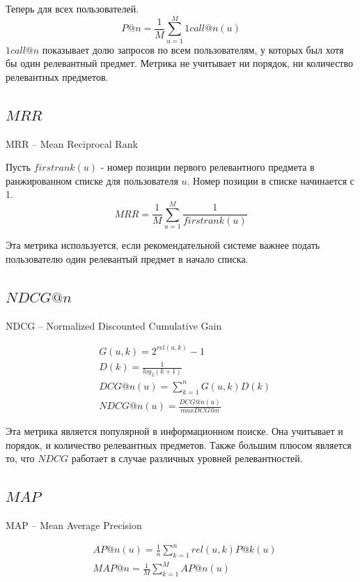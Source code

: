\documentclass[a4paper,12pt]{article}
\begin{document}
	Теперь для всех пользователей.
	\begin{equation*}
		P@n = \frac{1}{M}\sum_{u = 1}^M 1call@n(u)
	\end{equation*}
	$1call@n$ показывает долю запросов по всем пользователям, у которых был хотя бы один релевантный предмет. Метрика не учитывает  ни порядок, ни количество релевантных предметов. 
\subsection{$MRR$}
	MRR -- Mean Reciprocal Rank
	
	Пусть $firstrank(u)$  - номер позиции первого релевантного предмета в ранжированном списке для пользователя $u$. Номер позиции в списке начинается с 1.
	\begin{equation*}
		MRR = \frac{1}{M}\sum^{M}_{u=1}\frac{1}{firstrank(u)}	
	\end{equation*}
	
	Эта метрика используется, если рекомендательной системе важнее подать пользователю один релевантый предмет в начало списка. 

	 
\subsection{$NDCG@n$}
	NDCG -- Normalized Discounted Cumulative Gain
	
	\begin{equation*}
	\begin{split}
	 & G(u, k) = 2^{rel(u, k)} - 1 \\
	 & D(k) = \frac{1}{log_2(k + 1)} \\
	 & DCG@n(u) = \sum_{k=1}^n G(u, k) D(k) \\
	 & NDCG@n(u) = \frac{DCG@n(u)}{max DCG@n}
	\end{split}			
	\end{equation*}
	
	Эта метрика является популярной в информационном поиске. Она учитывает и порядок, и количество релевантных предметов. Также большим плюсом является то, что $NDCG$ работает в случае различных уровней релевантностей.
	
\subsection{$MAP$}
	MAP -- 	Mean Average Precision
	
	
	\begin{equation*}
	\begin{split}
	 & AP@n(u) = \frac{1}{n}\sum_{k=1}^n rel(u, k) P@k(u)  \\
	 & MAP@n = \frac{1}{M}\sum_{k=1}^M AP@n(u) \\
	\end{split}			
	\end{equation*}
	
\end{document}
